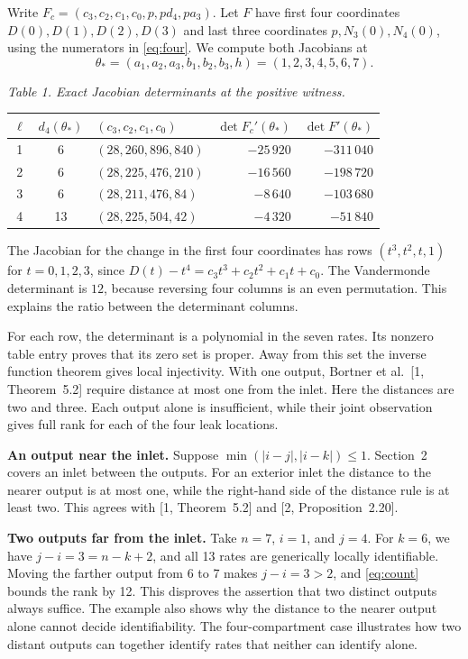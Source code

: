 \documentclass[11pt,a4paper]{article}
\begin{document}
Write \(F_c=(c_3,c_2,c_1,c_0,p,pd_4,pa_3)\). Let \(F\) have first four coordinates \(D(0),D(1),D(2),D(3)\) and last three coordinates \(p,N_3(0),N_4(0)\), using the numerators in \eqref{eq:four}. We compute both Jacobians at
\[ \theta_*=(a_1,a_2,a_3,b_1,b_2,b_3,h)=(1,2,3,4,5,6,7). \]
\begin{center}
\begin{minipage}{\linewidth}\centering
{\small\itshape Table 1. Exact Jacobian determinants at the positive witness.\par}\smallskip
\begin{tabular}{cclrr}
\toprule
\(\ell\)&\(d_4(\theta_*)\)&\((c_3,c_2,c_1,c_0)\)&\(\det F_c'(\theta_*)\)&\(\det F'(\theta_*)\)\\
\midrule
1&6 &\((28,260,896,840)\)&\(-25\,920\)&\(-311\,040\)\\
2&6 &\((28,225,476,210)\)&\(-16\,560\)&\(-198\,720\)\\
3&6 &\((28,211,476,84)\)&\(-8\,640\)&\(-103\,680\)\\
4&13&\((28,225,504,42)\)&\(-4\,320\)&\(-51\,840\)\\
\bottomrule
\end{tabular}
\end{minipage}
\end{center}
The Jacobian for the change in the first four coordinates has rows \((t^3,t^2,t,1)\) for \(t=0,1,2,3\), since \(D(t)-t^4=c_3t^3+c_2t^2+c_1t+c_0\). The Vandermonde determinant is \(12\), because reversing four columns is an even permutation. This explains the ratio between the determinant columns.

For each row, the determinant is a polynomial in the seven rates. Its nonzero table entry proves that its zero set is proper. Away from this set the inverse function theorem gives local injectivity. With one output, Bortner et al.~[1, Theorem~5.2] require distance at most one from the inlet. Here the distances are two and three. Each output alone is insufficient, while their joint observation gives full rank for each of the four leak locations.

\noindent\textbf{An output near the inlet.}
Suppose \(\min(|i-j|,|i-k|)\le1\). Section~2 covers an inlet between the outputs. For an exterior inlet the distance to the nearer output is at most one, while the right-hand side of the distance rule is at least two. This agrees with [1, Theorem~5.2] and [2, Proposition~2.20].

\noindent\textbf{Two outputs far from the inlet.}
Take \(n=7\), \(i=1\), and \(j=4\). For \(k=6\), we have \(j-i=3=n-k+2\), and all 13 rates are generically locally identifiable. Moving the farther output from 6 to 7 makes \(j-i=3>2\), and \eqref{eq:count} bounds the rank by 12. This disproves the assertion that two distinct outputs always suffice. The example also shows why the distance to the nearer output alone cannot decide identifiability. The four-compartment case illustrates how two distant outputs can together identify rates that neither can identify alone.
\end{document}
